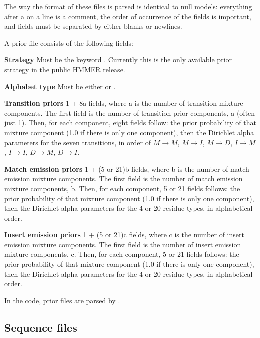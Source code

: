 The way the format of these files is parsed is identical to null
models: everything after a \prog{\#} on a line is a comment, the order
of occurrence of the fields is important, and fields must be separated
by either blanks or newlines.

A prior file consists of the following fields:

\begin{wideitem}
\item [\textbf{Strategy}] Must be the keyword . Currently 
this is the only available prior strategy in the public HMMER release.

\item [\textbf{Alphabet type}] Must be either  or
.

\item [\textbf{Transition priors}] 1 + 8a fields, where a
is the number of transition mixture components. The first field is the
number of transition prior components, a (often just 1). Then, for each
component, eight fields follow: the prior probability of that mixture
component (1.0 if there is only one component), then the Dirichlet
alpha parameters for the seven transitions, in order of $M \rightarrow
M$, $M \rightarrow I$, $M \rightarrow D$, $I \rightarrow M$, $I
\rightarrow I$, $D \rightarrow M$, $D \rightarrow I$.

\item [\textbf{Match emission priors}] 1 + (5 or 21)b fields,
where b is the number of match emission mixture components.  The first
field is the number of match emission mixture components, b. Then, for
each component, 5 or 21 fields follows: the prior probability of that
mixture component (1.0 if there is only one component), then the
Dirichlet alpha parameters for the 4 or 20 residue types, in
alphabetical order.

\item [\textbf{Insert emission priors}] 1 + (5 or 21)c fields,
where c is the number of insert emission mixture components.  The
first field is the number of insert emission mixture components,
c. Then, for each component, 5 or 21 fields follows: the prior
probability of that mixture component (1.0 if there is only one
component), then the Dirichlet alpha parameters for the 4 or 20
residue types, in alphabetical order.
\end{wideitem}

In the code, prior files are parsed by .

\subsection{Sequence files}


